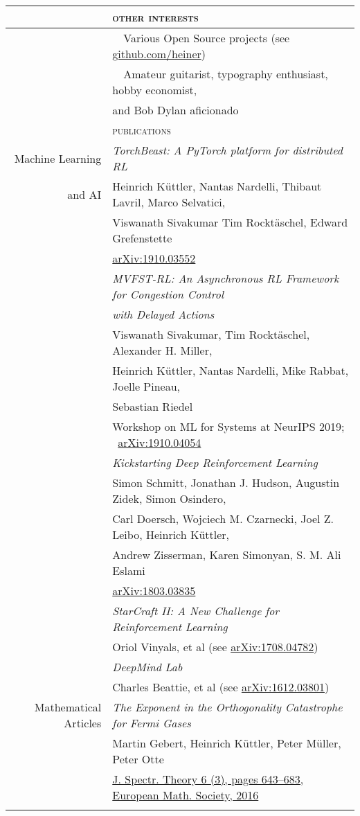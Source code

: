 \documentclass[11pt,english,a4paper]{memoir}
\newcommand{\red}{\color{Maroon}}
\newcommand{\header}[1]{%
  \addlinespace[2ex]
  & \large{\red\textsc{\MakeLowercase{#1}}} \tabularnewline
  \midrule}
\newcommand{\n}{\tabularnewline}
\newcommand{\bull}{\Pisymbol{MinionPro-Extra}{146}~~}
\newcommand{\nobull}{\phantom{\bull}}
\begin{document}
\begin{center}
\begin{tabular}{rl}
  \n
  \header{Other interests}

  & \bull Various Open Source projects
  (see \href{https://github.com/heiner}{github.com/heiner}) \n
  & \bull Amateur guitarist, typography enthusiast,
  hobby economist,  \\
  & \nobull and Bob Dylan aficionado

  \n
  \header{Publications}
  Machine Learning

  & \textit{TorchBeast: A PyTorch platform for distributed RL} \\
  and AI
  & Heinrich K{\"u}ttler, Nantas Nardelli, Thibaut Lavril, Marco
  Selvatici, \\
  & Viswanath Sivakumar Tim Rockt{\"a}schel, Edward Grefenstette \\
  & \href{https://arxiv.org/abs/1910.03552}{arXiv:1910.03552} \n \addlinespace

  & \textit{MVFST-RL: An Asynchronous RL Framework for Congestion
    Control} \\
  & \textit{with Delayed Actions} \\
  & Viswanath Sivakumar, Tim Rocktäschel, Alexander H. Miller, \\
  & Heinrich Küttler, Nantas Nardelli, Mike Rabbat, Joelle Pineau, \\
  & Sebastian Riedel \\
  & Workshop on ML for Systems at NeurIPS 2019; \ \href{https://arxiv.org/abs/1910.04054}{arXiv:1910.04054}
  \n \addlinespace

  & \textit{Kickstarting Deep Reinforcement Learning} \\
  & Simon Schmitt, Jonathan J. Hudson, Augustin Zidek, Simon Osindero, \\
  & Carl Doersch, Wojciech M. Czarnecki, Joel Z. Leibo, Heinrich Küttler, \\
  & Andrew Zisserman, Karen Simonyan, S. M. Ali Eslami \\
  & \href{https://arxiv.org/abs/1803.03835}{arXiv:1803.03835}
  \n \addlinespace

  & \textit{StarCraft II: A New Challenge for Reinforcement Learning} \\
  & Oriol Vinyals, et al (see \href{https://arxiv.org/abs/1708.04782}{arXiv:1708.04782}) \n \addlinespace

  & \textit{DeepMind Lab} \\
  & Charles Beattie, et al (see \href{https://arxiv.org/abs/1612.03801}{arXiv:1612.03801}) \n \addlinespace

  Mathematical Articles
  & \textit{The Exponent in the Orthogonality Catastrophe for Fermi Gases} \\
  & Martin Gebert, Heinrich Küttler, Peter Müller, Peter Otte \\
  & \href{http://dx.doi.org/10.4171/JST/135}{J. Spectr. Theory 6 (3), pages 643--683, European Math. Society, 2016} \n \addlinespace


\end{tabular}
\end{center}
\end{document}
